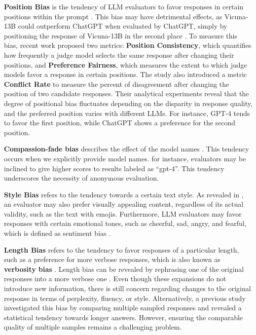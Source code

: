 \textbf{Position Bias} is the tendency of LLM evaluators to favor responses in certain positions within the prompt \cite{wang-etal-2024-large-language-models-fair, thakur2024judging, shi2024judging, ye2024justice}. 
This bias may have detrimental effects, as Vicuna-13B could outperform ChatGPT when evaluated by ChatGPT, simply by positioning the response of Vicuna-13B in the second place \cite{wang-etal-2024-large-language-models-fair}.
To measure this bias, recent work \cite{shi2024judging} proposed two metrics: \textbf{Position Consistency}, which quantifies how frequently a judge model selects the same response after changing their positions, and \textbf{Preference Fairness}, which measures the extent to which judge models favor a response in certain positions.
The study \cite{wang-etal-2024-large-language-models-fair} also introduced a metric \textbf{Conflict Rate} to measure the percent of disagreement after changing the position of two candidate responses.
Their analytical experiments reveal that the degree of positional bias fluctuates depending on the disparity in response quality, and the preferred position varies with different LLMs. 
For instance, GPT-4 tends to favor the first position, while ChatGPT shows a preference for the second position.



\textbf{Compassion-fade bias} describes the  effect of the model names \citep{koo2023benchmarking, ye2024justice}. 
This tendency occurs when we explicitly provide model names. 
for instance, evaluators may be inclined to give higher scores to results labeled as ``gpt-4''. 
This tendency underscores the necessity of anonymous evaluation.

\textbf{Style Bias} refers to the tendency towards a certain text style.
As revealed in \cite{chen2024humans}, an evaluator may also prefer visually appealing content, regardless of its actual validity, such as the text with emojis.
Furthermore, LLM evaluators may favor responses with certain emotional tones, such as cheerful, sad, angry, and fearful, which is defined as sentiment bias \cite{ye2024justice,li2023examining}.

\textbf{Length Bias} refers to the tendency to favor responses of a particular length, such as a preference for more verbose responses, which is also known as \textbf{verbosity bias}  \cite{offsetbias, huang2024_finetuned_judge, nips_llm_as_a_judge, ye2024justice}. 
Length bias can be revealed by rephrasing one of the original responses into a more verbose one \cite{ye2024justice, nips_llm_as_a_judge}. 
Even though these expansions do not introduce new information, there is still concern regarding changes to the original response in terms of perplexity, fluency, or style.
Alternatively, a previous study \cite{saito2023verbosity} investigated this bias by comparing multiple sampled responses and revealed a statistical tendency towards longer answers. 
However, ensuring the comparable quality of multiple samples remains a challenging problem.


